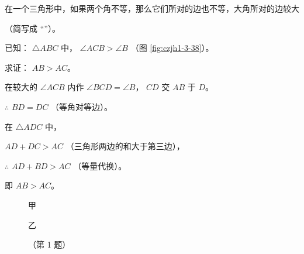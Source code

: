 %     

\liti \begin{xingzhi}
    在一个三角形中，如果两个角不等，那么它们所对的边也不等，大角所对的边较大
\end{xingzhi} （简写成 “”）。

已知： $\triangle ABC$ 中， $\angle ACB > \angle B$ （图 \ref{fig:czjh1-3-38}）。

求证： $AB > AC$。

\zhengming 在较大的 $\angle ACB$ 内作 $\angle BCD = \angle B$， $CD$ 交 $AB$ 于 $D$。

$\therefore$ \quad $BD = DC$ （等角对等边）。

在 $\triangle ADC$ 中，

\qquad $AD + DC > AC$  （三角形两边的和大于第三边），

$\therefore$ \quad $AD + BD > AC$ （等量代换）。

即 \quad $AB > AC$。



\begin{lianxi}

\xiaoti{}%
\begin{xiaoxiaotis}%


\end{xiaoxiaotis}

\begin{figure}[htbp]
    \centering
    \begin{minipage}[b]{7cm}
        \centering
        
        \caption*{甲}
    \end{minipage}
    \qquad
    \begin{minipage}[b]{7cm}
        \centering
        
        \caption*{乙}
    \end{minipage}
    \caption*{（第 1 题）}
\end{figure}





\end{lianxi}


